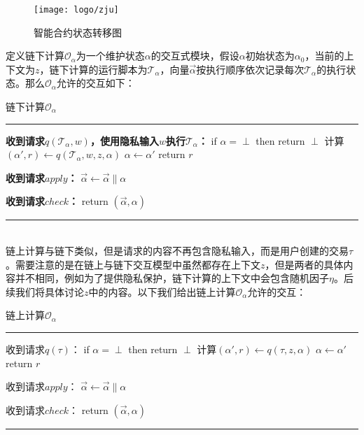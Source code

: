 \begin{figure}[htbp]
    \centering
    \texttt{[image: logo/zju]}
    \caption{\label{fig:ch3-transfer}智能合约状态转移图}
\end{figure}

定义链下计算$\mathcal{O}_{\alpha}$为一个维护状态$\alpha$的交互式模块，假设$\alpha$初始状态为$\alpha_0$，当前的上下文为$z$，链下计算的运行脚本为$\mathcal{T}_\alpha$，向量$\vec{\alpha}$按执行顺序依次记录每次$\mathcal{T}_\alpha$的执行状态。那么$\mathcal{O}_{\alpha}$允许的交互如下：

\begin{center}
    链下计算$\mathcal{O}_{\alpha}$
\end{center}
\noindent\hrule
\begin{description}
    \setlength{\itemsep}{0pt}
    \setlength{\parsep}{0pt}
    \setlength{\parskip}{0pt}
\item \textbf{收到请求$q(\mathcal{T}_\alpha, w)$，使用隐私输入$w$执行$\mathcal{T}_\alpha$：}\newline
if $\alpha = \perp$ then return $\perp$\newline
计算$(\alpha', r) \leftarrow q(\mathcal{T}_\alpha, w, z, \alpha)$\newline
$\alpha \leftarrow \alpha'$\newline
return $r$
\item \textbf{收到请求$apply$：}\newline
$\vec{\alpha} \leftarrow \vec{\alpha} \parallel \alpha$
\item \textbf{收到请求$check$：}\newline
return $(\vec{\alpha}, \alpha)$
\end{description}
\noindent\hrule
~\\

链上计算与链下类似，但是请求的内容不再包含隐私输入，而是用户创建的交易$\tau$。需要注意的是在链上与链下交互模型中虽然都存在上下文$z$，但是两者的具体内容并不相同，例如为了提供隐私保护，链下计算的上下文中会包含随机因子$\eta$。后续我们将具体讨论$z$中的内容。以下我们给出链上计算$\mathcal{O}_{\alpha}$允许的交互：

\begin{center}
    链上计算$\mathcal{O}_{\alpha}$
\end{center}
\noindent\hrule
\begin{description}
    \setlength{\itemsep}{0pt}
    \setlength{\parsep}{0pt}
    \setlength{\parskip}{0pt}
\item 收到请求$q(\tau)$：\newline
if $\alpha = \perp$ then return $\perp$\newline
计算$(\alpha', r) \leftarrow q(\tau, z, \alpha)$\newline
$\alpha \leftarrow \alpha'$\newline
return $r$
\item 收到请求$apply$：\newline
$\vec{\alpha} \leftarrow \vec{\alpha} \parallel \alpha$
\item 收到请求$check$：\newline
return $(\vec{\alpha}, \alpha)$
\end{description}
\noindent\hrule
~\\

